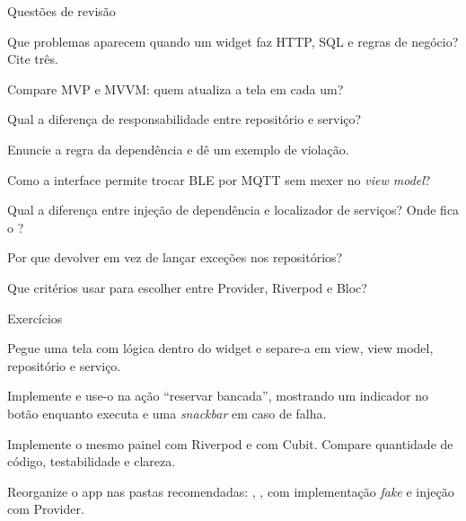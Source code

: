 \documentclass[aspectratio=169,10pt]{beamer}
\begin{document}
\begin{frame}{Questões de revisão}
  \begin{questoes}
    \item Que problemas aparecem quando um widget faz HTTP, SQL e regras de negócio? Cite três.
    \item Compare MVP e MVVM: quem atualiza a tela em cada um?
    \item Qual a diferença de responsabilidade entre repositório e serviço?
    \item Enuncie a regra da dependência e dê um exemplo de violação.
    \item Como a interface  permite trocar BLE por MQTT sem mexer no \emph{view model}?
    \item Qual a diferença entre injeção de dependência e localizador de serviços? Onde fica o ?
    \item Por que devolver  em vez de lançar exceções nos repositórios?
    \item Que critérios usar para escolher entre Provider, Riverpod e Bloc?
  \end{questoes}
\end{frame}

\begin{frame}{Exercícios}
  \begin{exercicio}
    Pegue uma tela com lógica dentro do widget e separe-a em view, view model, repositório e serviço.
  \end{exercicio}
  \begin{exercicio}
    Implemente  e use-o na ação ``reservar bancada'', mostrando um indicador no botão enquanto executa e uma \emph{snackbar} em caso de falha.
  \end{exercicio}
  \begin{exercicio}
    Implemente o mesmo painel com Riverpod e com Cubit. Compare quantidade de código, testabilidade e clareza.
  \end{exercicio}
  \begin{projeto}
    Reorganize o app nas pastas recomendadas: , ,  com implementação \emph{fake} e injeção com Provider.
  \end{projeto}
\end{frame}
\end{document}

